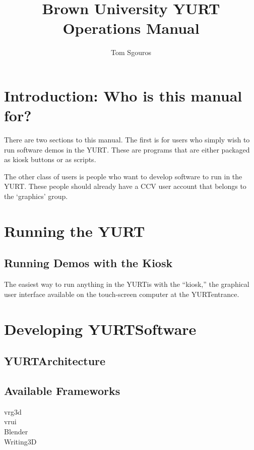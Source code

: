 \documentclass[11pt]{article}
\newcommand{\yurt}{YURT}
\begin{document}
\title{Brown University YURT Operations Manual}
\author{Tom Sgouros}
\maketitle

\tableofcontents

\section{Introduction: Who is this manual for?}

There are two sections to this manual.  The first is for users who
simply wish to run software demos in the \yurt.  These are programs
that are either packaged as kiosk buttons or as scripts.

The other class of users is people who want to develop software to run
in the \yurt.  These people should already have a CCV user account that
belongs to the `graphics' group.

\section{Running the \yurt}

\subsection{Running Demos with the Kiosk}

The easiest way to run anything in the \yurt is with the ``kiosk,''
the graphical user interface available on the touch-screen computer at
the \yurt entrance.


\section{Developing \yurt Software}

\subsection{\yurt Architecture}

\subsection{Available Frameworks}

\begin{description}

\item[vrg3d]

\item[vrui]

\item[Blender]

\item[Writing3D]

\end{description}
\end{document}
